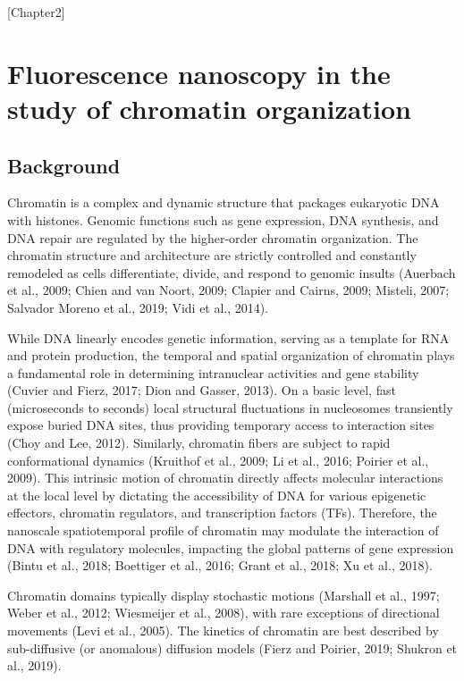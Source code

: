 [Chapter2]

\chapter{Fluorescence nanoscopy in the study of chromatin organization}

\section{Background}

Chromatin is a complex and dynamic structure that packages eukaryotic DNA with histones. Genomic functions such as gene expression, DNA synthesis, and DNA repair are regulated by the higher-order chromatin organization. The chromatin structure and architecture are strictly controlled and constantly remodeled as cells differentiate, divide, and respond to genomic insults (Auerbach et al., 2009; Chien and van Noort, 2009; Clapier and Cairns, 2009; Misteli, 2007; Salvador Moreno et al., 2019; Vidi et al., 2014).

While DNA linearly encodes genetic information, serving as a template for RNA and protein production, the temporal and spatial organization of chromatin plays a fundamental role in determining intranuclear activities and gene stability (Cuvier and Fierz, 2017; Dion and Gasser, 2013). On a basic level, fast (microseconds to seconds) local structural fluctuations in nucleosomes transiently expose buried DNA sites, thus providing temporary access to interaction sites (Choy and Lee, 2012). Similarly, chromatin fibers are subject to rapid conformational dynamics (Kruithof et al., 2009; Li et al., 2016; Poirier et al., 2009). This intrinsic motion of chromatin directly affects molecular interactions at the local level by dictating the accessibility of DNA for various epigenetic effectors, chromatin regulators, and transcription factors (TFs). Therefore, the nanoscale spatiotemporal profile of chromatin may modulate the interaction of DNA with regulatory molecules, impacting the global patterns of gene expression (Bintu et al., 2018; Boettiger et al., 2016; Grant et al., 2018; Xu et al., 2018).

Chromatin domains typically display stochastic motions (Marshall et al., 1997; Weber et al., 2012; Wiesmeijer et al., 2008), with rare exceptions of directional movements (Levi et al., 2005). The kinetics of chromatin are best described by sub-diffusive (or anomalous) diffusion models (Fierz and Poirier, 2019; Shukron et al., 2019).

